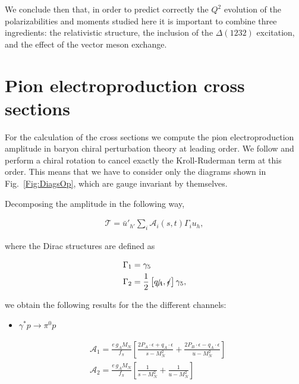 \documentclass[prc,twocolumn,showpacs,preprintnumbers,amsmath,amssymb
,superscriptaddress,a4paper,nofootinbib
]{revtex4-1}
\begin{document}
We conclude then that, in order to predict correctly the $Q^2$ evolution of the polarizabilities and moments studied here it is important to combine three ingredients: the relativistic structure, the inclusion of the $\Delta(1232)$ excitation, and the effect of the vector meson exchange.


\appendix


\section{Pion electroproduction cross sections}\label{App:CrossSections}

For the calculation of the cross sections we compute the pion electroproduction amplitude in baryon chiral perturbation theory at leading order.
We follow \cite{Holstein:2005db,Lensky:2009uv} and perform a chiral rotation to cancel exactly the Kroll-Ruderman term at this order.
This means that we have to consider only the diagrams shown in Fig.~\ref{Fig:DiagsOp}, which are gauge invariant by themselves.

Decomposing the amplitude in the following way,

\begin{align}\label{Eq:T-decomposition}
\mathcal{T}= \bar{u}'_{h'} \sum_{i}  \mathcal{A}_i (s,t) \Gamma_i u_h,
\end{align}

where the Dirac structures are defined as

\begin{align}\label{Eq:DefGammas}
  \Gamma_1&= \gamma_5 \\
  \Gamma_2&= \frac{1}{2}\left[\slashed{q_A},\slashed{\epsilon}\right]\gamma_5,  
\end{align}


we obtain the following results for the the different channels:


\begin{itemize}
 \item $\gamma^* p \to \pi^0 p$
\end{itemize}
\begin{align}
  &\mathcal{A}_1= \frac{e\, g_A M_N}{f_\pi}\left[\frac{2 P_A\cdot \epsilon + q_A\cdot \epsilon}{s-M_N^2} + \frac{2 P_B\cdot \epsilon - q_A\cdot \epsilon}{u-M_N^2}\right] \\
   &\mathcal{A}_2=\frac{e\, g_A M_N}{f_\pi}\left[\frac{1}{s-M_N^2} + \frac{1}{u-M_N^2}\right]
\end{align}
\end{document}
